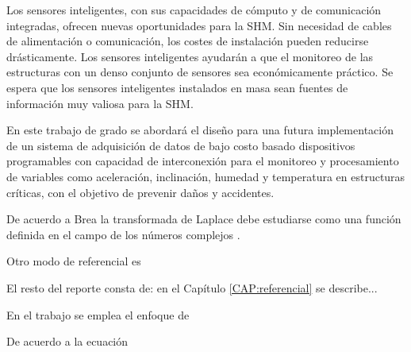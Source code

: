 Los sensores inteligentes, con sus capacidades de cómputo y de comunicación integradas, ofrecen nuevas oportunidades para la SHM. Sin necesidad de cables de alimentación o comunicación, los costes de instalación pueden reducirse drásticamente. Los sensores inteligentes ayudarán a que el monitoreo de las estructuras con un denso conjunto de sensores sea económicamente práctico. Se espera que los sensores inteligentes instalados en masa sean fuentes de información muy valiosa para la SHM.

En este trabajo de grado se abordará el diseño para una futura implementación de un sistema de adquisición de datos de bajo costo basado dispositivos programables con capacidad de interconexión para el monitoreo y procesamiento de variables como aceleración, inclinación, humedad y temperatura en estructuras críticas, con el objetivo de prevenir daños y accidentes.



De acuerdo a Brea  la transformada de Laplace debe estudiarse como
una función definida en el campo de los números complejos
\cite{brea5}.

Otro modo de referencial es \citep{brea5}

El resto del reporte consta de: en el Capítulo \ref{CAP:referencial} se
describe...

En el trabajo se emplea el enfoque de \cite{brigham1}

De acuerdo a la ecuación
